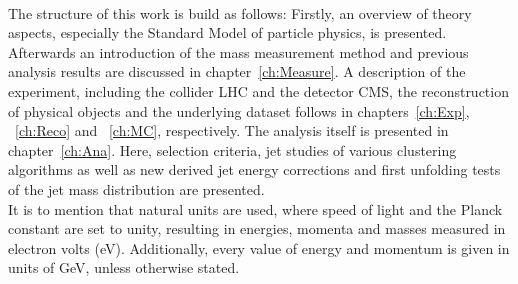 	\\
	The structure of this work is build as follows: Firstly, an overview of theory aspects, especially the Standard Model of particle physics, is presented. Afterwards an introduction of the mass measurement method and previous analysis results are discussed in chapter~\ref{ch:Measure}. A description of the experiment, including the collider LHC and the detector CMS, the reconstruction of physical objects and the underlying dataset follows in chapters~\ref{ch:Exp}, ~\ref{ch:Reco} and ~\ref{ch:MC}, respectively. The analysis itself is presented in chapter~\ref{ch:Ana}. Here, selection criteria, jet studies of various clustering algorithms as well as new derived jet energy corrections and first unfolding tests of the jet mass distribution are presented.
	\\
	It is to mention that natural units are used, where speed of light and the Planck constant are set to unity, resulting in energies, momenta and masses measured in electron volts (eV). Additionally, every value of energy and momentum is given in units of GeV, unless otherwise stated.